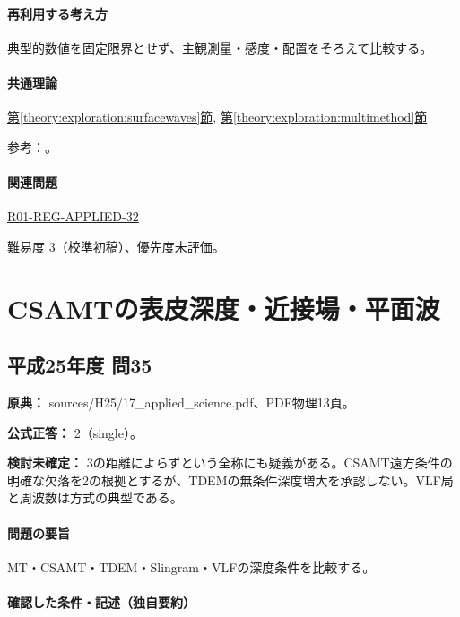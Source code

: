 \paragraph{再利用する考え方} 典型的数値を固定限界とせず、主観測量・感度・配置をそろえて比較する。

\paragraph{共通理論} \hyperref[theory:exploration:surfacewaves]{第\ref*{theory:exploration:surfacewaves}節}, \hyperref[theory:exploration:multimethod]{第\ref*{theory:exploration:multimethod}節}

\par 参考：\cite{epa_surfacewaves,gsi_gravity_definitions,naro_thermal2008,landslide_thermal2007}。

\paragraph{関連問題} \hyperref[q:r01-reg-applied-32]{R01-REG-APPLIED-32}

\par 難易度 3（校準初稿）、優先度未評価。

\section{CSAMTの表皮深度・近接場・平面波}

\subsection{平成25年度 問35}
\label{q:h25-reg-applied-35}

\noindent\textbf{原典：} sources/H25/17\_applied\_science.pdf、PDF物理13頁。

\textbf{公式正答：} 2（single）。

\par\textbf{検討未確定：} 3の距離によらずという全称にも疑義がある。CSAMT遠方条件の明確な欠落を2の根拠とするが、TDEMの無条件深度増大を承認しない。VLF局と周波数は方式の典型である。

\paragraph{問題の要旨} MT・CSAMT・TDEM・Slingram・VLFの深度条件を比較する。

\paragraph{確認した条件・記述（独自要約）}\mbox{}\par

